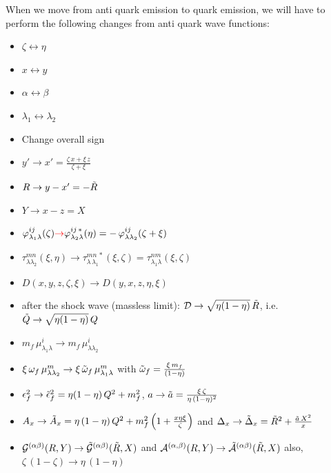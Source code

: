\documentclass[9pt]{article}
\newcommand{\chg}[1]{{\color{red}#1}}
\numberwithin{equation}{section}
\begin{document}
\begin{enumerate}
When we move from anti quark emission to quark emission, we will have to perform the following changes from anti quark wave functions:
\begin{itemize}
    \item $\zeta \leftrightarrow \eta$
    \item $x\leftrightarrow y$
    \item $\alpha \leftrightarrow \beta$
    \item $\lambda_{1}\leftrightarrow \lambda_{2}$
    \item Change overall sign
    \item $y'\rightarrow x' = \frac{\zeta\,x + \xi\, z}{\zeta + \xi}$
    \item $R \rightarrow y-x' = -\Tilde{R}$
    \item $Y \rightarrow x-z  = X$
    \item $\label{chg:phirule}\varphi^{ij}_{\lambda_{1}\lambda}(\zeta) \chg{\rightarrow} \varphi^{ij\,*}_{\lambda_{2}\lambda}(\eta) = -\,\varphi^{ij}_{\lambda\lambda_{2}}(\zeta+\xi)$
    \item $\tau^{mn}_{\lambda\lambda_{2}}(\xi,\eta) \rightarrow \tau^{mn\,*}_{\lambda\,\lambda_{1}}(\xi,\zeta) = \tau^{nm}_{\lambda_{1}\lambda}(\xi,\zeta)$
    \item $D(x,y,z,\zeta, \xi) \rightarrow D(y,x,z,\eta,\xi)$
    \label{chg:Drule}\item \chg{after the shock wave (massless limit): $\mathcal{D}\rightarrow\sqrt{\eta(1-\eta)}\,\Tilde{R}$, i.e.\ $\Tilde{Q}\rightarrow\sqrt{\eta(1-\eta)}\,Q$}
    \item $m_{f}\,\mu^{i}_{\lambda_{1}\lambda} \rightarrow m_{f}\,\mu^{i}_{\lambda\lambda_{2}} $
    \item $\xi\, \omega_{f}\,\mu^{m}_{\lambda\lambda_{2}} \rightarrow \xi\, \Tilde{\omega}_{f}\,\mu^{m}_{\lambda_{1}\lambda}$ with $\Tilde{\omega}_{f} = \frac{\xi\,m_{f}}{(1-\eta)}$
    \item $\epsilon^{2}_{f} \rightarrow \Tilde{\epsilon}^{2}_{f} = \eta(1-\eta)\, Q^{2} + m^{2}_{f}$, $a \rightarrow \Tilde{a} = \frac{\xi\,\zeta}{\eta\, (1-\eta)^{2}}$
    \item $A_{x} \rightarrow \Tilde{A}_{x} = \eta\,(1-\eta)\,Q^{2} + m^{2}_{f}\left(1+\frac{x\eta\xi}{\zeta}\right)$ and $\Delta_{x} \rightarrow \Tilde{\Delta}_{x} = \Tilde{R}^{2} + \frac{\Tilde{a}\,X^{2}}{x}$
    \item $\mathcal{G}^{(\alpha\beta)}(R,Y) \rightarrow \mathcal{\Tilde{G}}^{(\alpha\beta)}(\Tilde{R},X) $ and $\mathcal{A}^{(\alpha,\beta)}(R,Y) \rightarrow \mathcal{\Tilde{A}}^{(\alpha\beta)}(\Tilde{R},X)$ also, $\zeta\,(1-\zeta) \rightarrow \eta\,(1-\eta)$

\end{itemize}
\end{enumerate}
\end{document}
